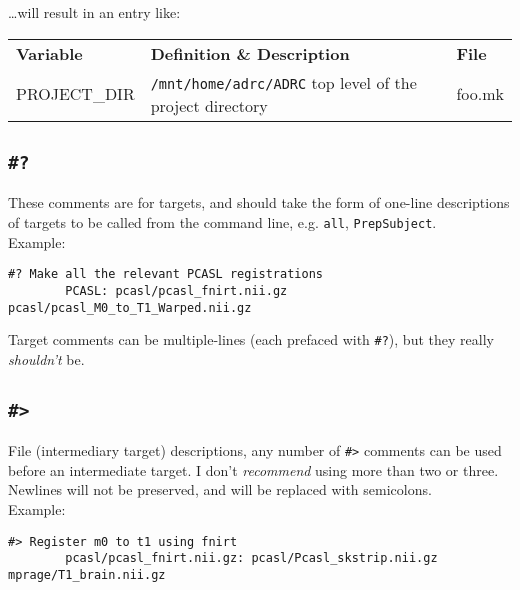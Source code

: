 \documentclass[oneside,11pt]{article}
\begin{document}
	\ldots will result in an entry like: \\
	
	\begin{tabularx}{\textwidth}{>{\ttfamily}l X >{\ttfamily}l}
		\rowcolor{gray!50}
		\textbf{Variable} & \textbf{Definition \& Description} & \textbf{File} \\
		PROJECT\_DIR	& \texttt{/mnt/home/adrc/ADRC} \newline top level of the project directory & foo.mk \\
		\bottomrule
	\end{tabularx}
	
	\subsection{\texttt{\#?}}
	
	These comments are for targets, and should take the form of one-line descriptions of targets to be called from the command line, e.g. \texttt{all}, \texttt{PrepSubject}. \\
	Example:
	\begin{lstlisting}[basicstyle=\ttfamily,gobble=16, breaklines=true]
		#? Make all the relevant PCASL registrations
		PCASL: pcasl/pcasl_fnirt.nii.gz pcasl/pcasl_M0_to_T1_Warped.nii.gz	
	\end{lstlisting} 
	
	Target comments can be multiple-lines (each prefaced with \texttt{\#?}), but they really \textit{shouldn't} be.
	
	\subsection{\texttt{\#>}}

	File (intermediary target) descriptions, any number of \texttt{\#>} comments can be used before an intermediate target. I don't \textit{recommend} using more than two or three. Newlines will not be preserved, and will be replaced with semicolons. \\ 
	Example: 
	\begin{lstlisting}[basicstyle=\ttfamily,gobble=16,breaklines=true]
		#> Register m0 to t1 using fnirt
		pcasl/pcasl_fnirt.nii.gz: pcasl/Pcasl_skstrip.nii.gz mprage/T1_brain.nii.gz
	\end{lstlisting}
\end{document}
